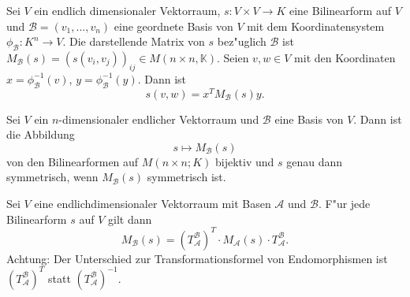 \documentclass[9pt, a4paper, twocolumn, landscape]{article}
\newcommand{\comment}[1]{}
\begin{document}
\begin{remark} Sei $V$ ein endlich dimensionaler Vektorraum, $s : V \times V \rightarrow K$ eine Bilinearform auf $V$ und $\mathcal{B} = (v_1, ..., v_n)$ eine geordnete Basis von $V$ mit dem Koordinatensystem  $\phi_\mathcal{B} : K^n \rightarrow V$.
Die darstellende Matrix von $s$ bez"uglich $\mathcal{B}$ ist $M_\mathcal{B}(s) = \left(s(v_i, v_j) \right)_{ij} \in M(n \times n, \mathbb{K})$.
Seien $v, w \in V$  mit den Koordinaten $x = \phi^{-1}_\mathcal{B}(v)$, $y = \phi^{-1}_\mathcal{B}(y)$. Dann ist
$$
s(v, w)= x^T M_\mathcal{B}(s) y.
$$
\comment{\left(x_{1}, \ldots, x_{n}\right)\left(\begin{array}{ccc}a_{11} & \cdots & a_{1 n} \\ \vdots & & \vdots \\ a_{n 1} & \cdots & a_{n n}\end{array}\right)\left(\begin{array}{c}y_{1} \\ \vdots \\ y_{n}\end{array}\right).}
\end{remark}

\begin{theorem}
Sei $V$ ein $n$-dimensionaler endlicher Vektorraum und $\mathcal{B}$ eine Basis von $V$. Dann ist  die Abbildung
\begin{equation*}
s \mapsto M_{\mathcal{B}}(s)
\end{equation*}
von den Bilinearformen auf $M(n \times n; K)$ bijektiv und $s$ genau dann symmetrisch, wenn $M_{\mathcal{B}}(s)$ symmetrisch ist. 
\end{theorem}



\comment{
\begin{lemma}
Seien $A, B \in M(n \times n; K)$ mit 
\begin{equation*}
x_TAy = x_TBy = 
\end{equation*}
f\uee r alle $x, y \in K^n$. Dann ist $A = B$. 
\end{lemma}
}

\begin{theorem}
Sei $V$ eine endlichdimensionaler Vektorraum mit Basen $\mathcal{A}$ und $ \mathcal{B}$. F"ur jede Bilinearform $s$ auf $V$ gilt dann
\begin{equation*}
M_\mathcal{B}(s) =( T^\mathcal{B}_\mathcal{A})^T \cdot M_\mathcal{A}(s) \cdot T^\mathcal{B}_\mathcal{A}.
\end{equation*}
Achtung: Der Unterschied zur Transformationsformel von Endomorphismen ist $( T^\mathcal{B}_\mathcal{A})^T$ statt $( T^\mathcal{B}_\mathcal{A})^{-1}$.
\end{theorem}
\end{document}
